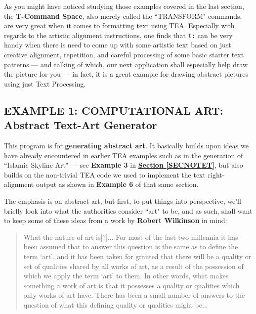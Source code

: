 \documentclass[a4paper, 18pt]{book} %
\begin{document}
{{{  
As you might have noticed studying those examples covered in the last section, the \textbf{T-Command Space}, also merely called the ``TRANSFORM" commands, are very great when it comes to formatting text using TEA. Especially with regards to the artistic alignment instructions, one finds that \texttt{t:} can be very handy when there is need to come up with some artistic text based on just creative alignment, repetition, and careful processing of some basic starter text patterns --- and talking of which, our next application shall especially help draw the picture for you --- in fact, it is a great example for drawing abstract pictures using just Text Processing.



\subsection{EXAMPLE 1: \textbf{COMPUTATIONAL ART:} Abstract Text-Art Generator}
\label{SECEXAMP1T}



This program is for \textbf{generating abstract art}. It basically builds upon ideas we have already encountered in earlier TEA examples such as in the generation of ``Islamic Skyline Art" --- see \textbf{Example 3} in \textbf{\hyperref[SECNOTET]{Section \ref{SECNOTET}}}, but also builds on the non-trivial TEA code we used to implement the text right-alignment output as shown in \textbf{Example 6} of that same section. 

\vspace{2em}

The emphasis is on abstract art, but first, to put things into perspective, we'll briefly look into what the authorities consider ``art" to be, and as such, shall want to keep some of these ideas from a work by \textbf{Robert Wilkinson}\cite{wilkinson1991theories} in mind:\\




\noindent
\begin{minipage}{1\textwidth}
\vspace{1em}
\begin{quotation}
{\ttfamily

What the nature of art is[?]... For most of the last two millennia it has been assumed that to answer this question is the same as to define the term `art', and it has been taken for granted that there will be a quality or set of qualities shared by all works of art, as a result of the possession of which we apply the term `art' to them. In other words, what makes something a work of art is that it possesses a quality or qualities which only works of art have. There has been a small number of answers to the question of what this defining quality or qualities might be...

}
\end{quotation}
\end{minipage}}}}
\end{document}
